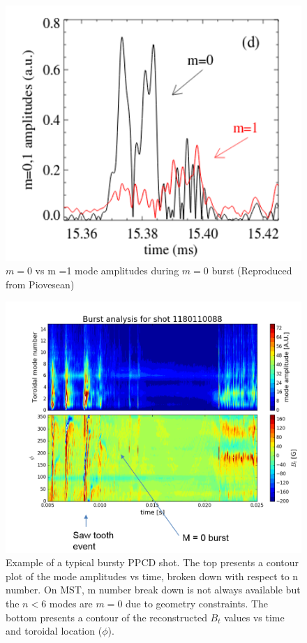 \begin{refsection}
\begin{figure}
	\centering
	\includegraphics[width = .7\linewidth]{./m0_and_impurity_heating/m0_timing.png}
	\caption[$m = 0$ vs m =1 mode amplitudes during $m = 0$ burst]{$m = 0$ vs m =1 mode amplitudes during $m = 0$ burst (Reproduced from Piovesean\cite{Piovesan2008})}
	\label{fig:m0_time}
\end{figure}

\begin{figure}
	\centering
	\includegraphics[width = 1.\linewidth]{./m0_and_impurity_heating/m0_example.png}
	\caption[Example mode and $B_t$ behavior]{Example of a typical bursty PPCD shot. The top presents a contour plot of the mode amplitudes vs time, broken down with respect to n number. On MST, m number break down is not always available but the $n < 6$ modes are $m = 0$ due to geometry constraints. The bottom presents a contour of the reconstructed $B_t$ values vs time and toroidal location ($\phi$). }
	\label{fig:m0_example}
\end{figure}


\end{refsection}
